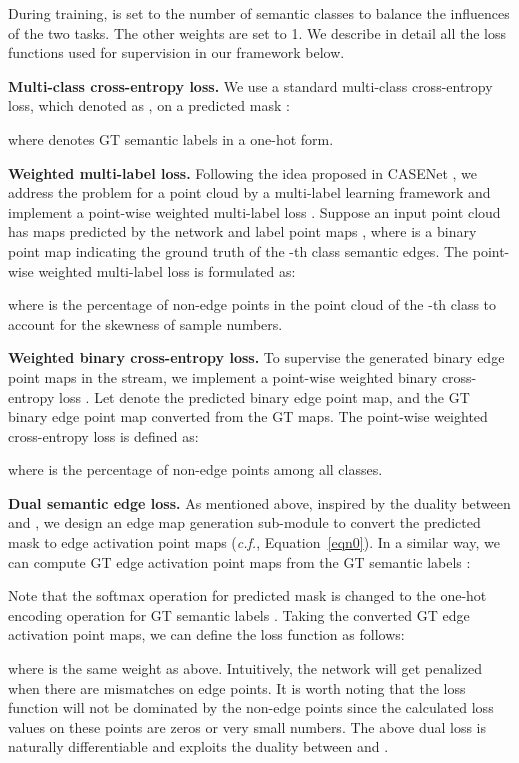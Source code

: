 \documentclass[runningheads]{llncs}
\begin{document}
During training,  is set to the number of semantic classes to balance the influences of the two tasks. The other weights are set to 1.
We describe in detail all the loss functions used for supervision in our framework below. 


\smallskip \noindent \textbf{Multi-class cross-entropy loss.}
We use {a} standard multi-class cross-entropy loss, which denoted as , on {a} predicted {\SemSegPoint} mask :
    
where  denotes GT semantic labels in {a} one-hot form. 


\smallskip \noindent \textbf{Weighted multi-label loss.}
Following the idea proposed in CASENet \cite{yu2017casenet}, we address the {\SemEdgeD} problem {for a point cloud}
by a multi-label learning framework and implement a point-wise weighted multi-label loss . Suppose an input point cloud  has  {\SemEdgePoint} maps   predicted by the network and  label point maps  , where  is a binary point map indicating the ground truth of the -th class semantic edges. The point-wise weighted multi-label loss  is formulated as:
    
where  is the percentage of non-edge points in the point cloud of the -th class to account for {the} skewness of sample numbers.


\smallskip \noindent \textbf{Weighted binary cross-entropy loss.}
To supervise the generated binary edge point maps in the {\SemEdgeD} stream, we implement a point-wise weighted binary cross-entropy loss . Let  denote
the predicted binary edge point map, 
and  the GT binary edge point map converted from the GT {\SemEdgePoint} maps. The point-wise weighted cross-entropy loss is defined as:
    
where  is the percentage of non-edge points among all classes.

\smallskip \noindent \textbf{Dual semantic edge loss.}
As mentioned above, inspired by the duality between {\SemSeg} and {\SemEdgeD}, we design an edge map generation {sub-module} to convert the predicted {\SemSegPoint} mask  to edge activation point maps  (\textit{c.f.}, Equation~\ref{eqn0}). In {a}
similar way, we can compute GT edge activation point maps  from the GT semantic labels :
     
Note that the softmax operation for predicted {\SemSegPoint} mask  is changed to the one-hot encoding operation for GT semantic labels . Taking the converted GT edge activation point maps, we can {define the loss function as follows:}

{where  is the same weight as above. Intuitively, the network will get penalized when there are mismatches on edge points.}
{It is worth noting that the loss function will not 
be dominated by the non-edge points {since the calculated loss values on these points are zeros or very small numbers}.} The above dual loss is naturally differentiable and exploits the duality between {\SemSeg} and {\SemEdgeD}. 
\end{document}
